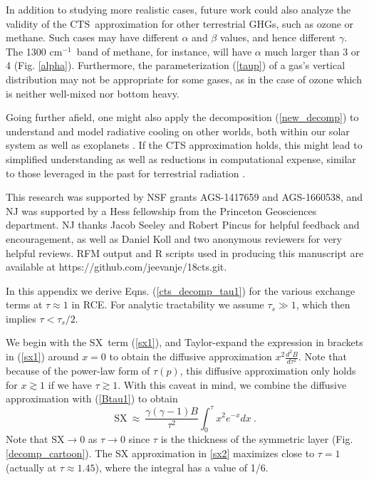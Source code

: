 \documentclass{ametsoc}
\newcommand{\beqn}{\begin{equation}}
\newcommand{\eeqn}{\end{equation}}
\newcommand{\eqnref}[1]{(\ref{#1})}
\newcommand{\cminverse}{\ensuremath{\mathrm{cm^{-1}}}}
\newcommand{\taus}{\ensuremath{\tau_s}}
\newcommand{\SX}{\ensuremath{\mathrm{SX}}}
\newcommand{\CTS}{\ensuremath{\mathrm{CTS}}}
\begin{document}
In addition to studying more realistic cases, future work could also analyze the validity of the \CTS\ approximation for other terrestrial GHGs, such as ozone or methane. Such cases may have different $\alpha$ and $\beta$ values, and hence different $\gamma$.  The 1300 \cminverse\ band of methane, for instance, will have  $\alpha$  much larger than 3 or 4 (Fig. \ref{alpha}). Furthermore, the parameterization \eqnref{taup} of a gas's vertical distribution may not be appropriate for some gases, as in the case of ozone which is neither well-mixed nor bottom heavy.  

Going further afield, one might also apply the decomposition \eqnref{new_decomp} to understand and model radiative cooling on other worlds, both within our solar system as well as exoplanets \citep[e.g.][]{amundsen2014}. If the CTS approximation holds, this might lead to simplified understanding as well as reductions in computational expense, similar to those leveraged in the past for terrestrial radiation  \citep[e.g.][]{schwarzkopf1991,fels1975}.

%
\acknowledgments
This research was supported by NSF grants AGS-1417659 and AGS-1660538, and NJ was supported by a  Hess fellowship from the Princeton Geosciences department.  NJ  thanks Jacob Seeley and Robert Pincus for helpful feedback and encouragement, as well as Daniel Koll and two anonymous reviewers for very helpful reviews. RFM output and R scripts used in producing this manuscript are available at  https://github.com/jeevanje/18cts.git.


%


\appendix[A]
\label{appendix_cts}
In this appendix we derive Eqns. \eqnref{cts_decomp_tau1} for the various exchange terms at $\tau\approx1$ in RCE. For analytic tractability we assume $\taus \gg 1$, which then implies $\tau < \taus/2$.

We begin with the \SX\ term \eqnref{sx1}, and Taylor-expand the expression in brackets in \eqnref{sx1} around $x=0$ to obtain the diffusive approximation $x^2\frac{d^2 B}{d \tau^2}$. Note that because of the power-law form of $\tau(p)$, this diffusive approximation only holds for $x\gtrsim 1$ if we have $\tau\gtrsim 1$. With this caveat in mind,  we combine the diffusive approximation with \eqnref{Btau1} to obtain
\beqn
 	\SX  \ \approx \    \frac{\gamma(\gamma-1) B}{ \tau^2} \int_0^\tau x^2 e^{-x} dx \ .
	\label{sx3}
\eeqn
Note that $\SX \rightarrow 0$ as $\tau\rightarrow 0$ since $\tau$ is the thickness of the symmetric layer (Fig. \ref{decomp_cartoon}). The SX  approximation in \eqref{sx2}  maximizes close to $\tau=1$ (actually at $\tau\approx 1.45$), where the integral has a value of 1/6. 
\end{document}
